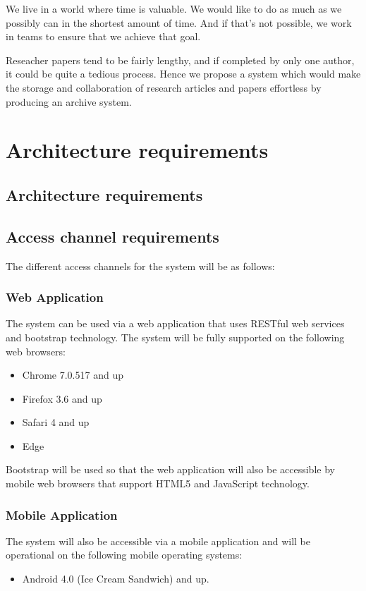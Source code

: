 \documentclass[11pt]{article}
\begin{document}
	We live in a world where time is valuable. We would like to do as much as we possibly can in the shortest amount of time. And if that's not possible, we work in teams to ensure that we achieve that goal.
	
	Reseacher papers tend to be fairly lengthy, and if completed by only one author, it could be quite a tedious process. Hence we propose a system which would make the storage and collaboration of research articles and papers effortless by producing an archive system.

	\newpage
	
	\section{Architecture requirements}
	
	\subsection{Architecture requirements}
		\subsection{Access channel requirements}
			The different access channels for the system will be as follows:
		\subsubsection{Web Application}
			The system can be used via a web application that uses RESTful web services and bootstrap technology. The system will be fully supported on the following web browsers:
				\begin{itemize}
					\item Chrome 7.0.517 and up
					\item Firefox 3.6 and up
					\item Safari 4 and up
					\item Edge
				\end{itemize}
			Bootstrap will be used so that the web application will also be accessible by mobile web browsers that support HTML5 and JavaScript technology.
		\subsubsection{Mobile Application}
			The system will also be accessible via a mobile application and will be operational on the following mobile operating systems:
				\begin{itemize}
					\item Android 4.0 (Ice Cream Sandwich) and up.
				\end{itemize}
	
\end{document}
